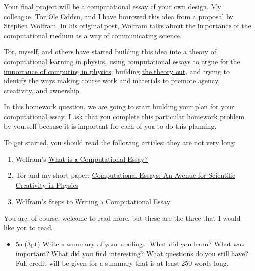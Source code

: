 \documentclass[11pt]{article}
\providecommand{\tightlist}{%
      \setlength{\itemsep}{0pt}\setlength{\parskip}{0pt}}
\begin{document}
Your final project will be a
\href{https://arxiv.org/abs/1909.12697}{computational essay} of your own
design. My colleague,
\href{https://www.mn.uio.no/fysikk/english/people/aca/toroo/}{Tor Ole
Odden}, and I have borrowed this idea from a proposal by
\href{https://www.stephenwolfram.com/}{Stephen Wolfram}. In his
\href{https://writings.stephenwolfram.com/2017/11/what-is-a-computational-essay}{original
post}, Wolfram talks about the importance of the computational medium as
a way of communicating science.

Tor, myself, and others have started building this idea into a
\href{https://journals.aps.org/prper/abstract/10.1103/PhysRevPhysEducRes.15.020152}{theory
of computational learning in physics}, using computational essays to
\href{https://www-nature-com.proxy2.cl.msu.edu/articles/s41567-023-02371-2}{argue
for the importance of computing in physics}, building
\href{https://pubs-aip-org.proxy2.cl.msu.edu/books/monograph/148/chapter/64396056/Physics-Computational-Literacy-What-Why-and-How}{the
theory out}, and trying to identify the ways making course work and
materials to promote
\href{https://onlinelibrary-wiley-com.proxy2.cl.msu.edu/doi/full/10.1002/tea.21821}{agency,
creativity, and ownership}.

In this homework question, we are going to start building your plan for
your computational essay. I ask that you complete this particular
homework problem by yourself because it is important for each of you to
do this planning.

To get started, you should read the following articles; they are not
very long:

\begin{enumerate}
\def\labelenumi{\arabic{enumi}.}
\tightlist
\item
  Wolfram's
  \href{https://writings.stephenwolfram.com/2017/11/what-is-a-computational-essay}{What
  is a Computational Essay?}
\item
  Tor and my short paper:
  \href{https://arxiv.org/abs/1909.12697}{Computational Essays: An
  Avenue for Scientific Creativity in Physics}
\item
  Wolfram's
  \href{https://www.wolframcloud.com/obj/Expositions/Published/ComputationalEssayGuidelines}{Steps
  to Writing a Computational Essay}
\end{enumerate}

You are, of course, welcome to read more, but these are the three that I
would like you to read.

\begin{itemize}
\tightlist
\item
  5a (3pt) Write a summary of your readings. What did you learn? What
  was important? What did you find interesting? What questions do you
  still have? Full credit will be given for a summary that is at least
  250 words long.
\end{itemize}
\end{document}
